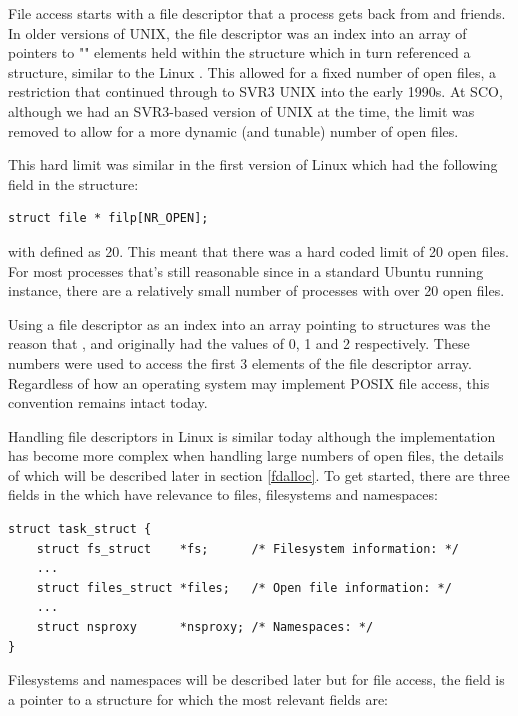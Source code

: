 File access starts with a file descriptor that a process gets back from  and friends. In older versions of UNIX, the file descriptor was an index into an array of pointers to "" elements held within the  structure which in turn referenced a  structure, similar to the Linux . This allowed for a fixed number of open files, a restriction that continued through to SVR3 UNIX into the early 1990s. At SCO, although we had an SVR3-based version of UNIX at the time, the limit was removed to allow for a more dynamic (and tunable) number of open files. 

This hard limit was similar in the first version of Linux which had the following field in the  structure:

\begin{lstlisting}
struct file * filp[NR_OPEN];
\end{lstlisting}

\noindent
with  defined as 20. This meant that there was a hard coded limit of 20 open files. For most processes that's still reasonable since in a standard Ubuntu running instance, there are a relatively small number of processes with over 20 open files. 

Using a file descriptor as an index into an array pointing to  structures was the reason that ,  and  originally had the values of 0, 1 and 2 respectively. These numbers were used to access the first 3 elements of the file descriptor array. Regardless of how an operating system may implement POSIX file access, this convention remains intact today.

Handling file descriptors in Linux is similar today although the implementation has become more complex when handling large numbers of open files, the details of which will be described later in section \ref{fdalloc}. To get started, there are three fields in the  which have relevance to files, filesystems and namespaces:

\begin{lstlisting}
struct task_struct {
    struct fs_struct    *fs;      /* Filesystem information: */
    ...
    struct files_struct *files;   /* Open file information: */
    ...
    struct nsproxy      *nsproxy; /* Namespaces: */
}
\end{lstlisting}

\noindent
Filesystems and namespaces will be described later but for file access, the  field is a pointer to a  structure for which the most relevant fields are:

